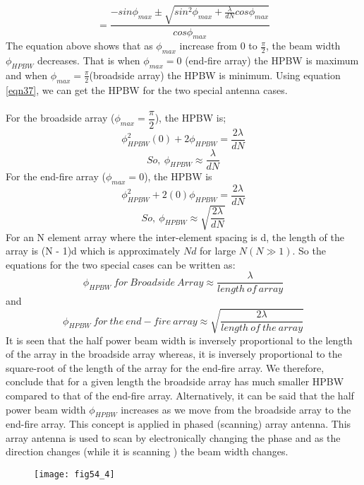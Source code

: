 $$ = \dfrac{-sin\phi_{max}\pm\sqrt{sin^2\phi_{max} + \frac{\lambda}{dN}cos\phi_{max}}}{cos\phi_{max}} $$
The equation above shows that as $\phi_{max}$ increase from $0$ to $\frac{\pi}{2}$, the beam width $\phi_{HPBW}$ decreases. That is when $\phi_{max} = 0$ (end-fire array) the HPBW is maximum and when $\phi_{max} = \frac{\pi}{2}$(broadside array) the HPBW  is minimum. Using equation \ref{eqn37}, we can get the HPBW for the two special antenna cases. \\ \\
For the broadside array ($\phi_{max} = \dfrac{\pi}{2}$), the HPBW is; 
$$ \phi^2_{HPBW}(0) + 2\phi_{HPBW} = \dfrac{2\lambda}{dN}$$
\begin{equation}
So, \ \phi_{HPBW} \approx \dfrac{\lambda}{dN}
\label{eqn39} 
\end{equation} 
For the end-fire array ($\phi_{max} = 0$), the HPBW is 
$$ \phi^2_{HPBW} + 2(0)\phi_{HPBW} = \dfrac{2\lambda}{dN} $$
\begin{equation}
So, \ \phi_{HPBW} \approx \sqrt{\dfrac{2\lambda}{dN}}
\label{eqn40}
\end{equation}
For an N element array where the inter-element spacing is d, the length of the array is (N - 1)d which is approximately $Nd$ for large $N(N\gg 1)$. So the equations for the two special cases can be written as: 
$$ \phi_{HPBW} \ for \ Broadside \ Array \approx \dfrac{\lambda}{length \ of \ array}$$ and
$$ \phi_{HPBW} \ for \ the \ end-fire \ array \approx \sqrt{\dfrac{2\lambda}{length \ of \  the \ array}}$$
It is seen that the half power beam width is inversely proportional to the length of the array in the broadside array whereas, it is inversely proportional to the square-root of the length of the array for the end-fire array. We therefore, conclude that for a given length the broadside array has much smaller HPBW compared to that of the end-fire array. Alternatively,
it can be said that the half power beam width $\phi_{HPBW}$ increases as we move from the broadside array to the end-fire array. This concept is applied in phased (scanning) array antenna. This array antenna is used to scan by electronically changing the phase and as the direction changes (while it is scanning ) the beam width changes.

\begin{figure}[h!]
	\texttt{[image: fig54\_4]}
	\centering
	\caption{}
	
	\label{54.7}
	
\end{figure}

